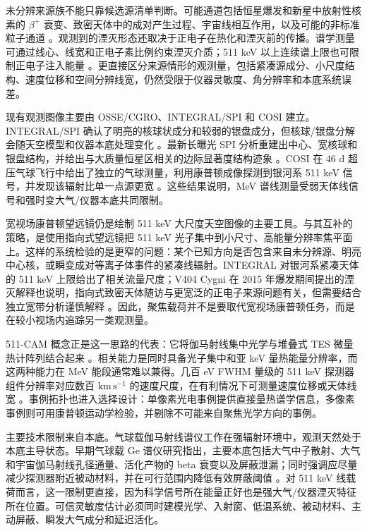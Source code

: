 \documentclass[preprint,12pt]{elsarticle}
\begin{document}
未分辨来源族不能只靠候选源清单判断。可能通道包括恒星爆发和新星中放射性核素的 $\beta^+$ 衰变、致密天体中的成对产生过程、宇宙线相互作用，以及可能的非标准粒子通道 \cite{Prantzos2011,Siegert2016AA,Yoneda2025}。观测到的湮灭形态还取决于正电子在热化和湮灭前的传播。谱学测量可通过线心、线宽和正电子素比例约束湮灭介质；511 keV 以上连续谱上限也可限制正电子注入能量 \cite{Prantzos2011,Jean2006,Siegert2019Kinematics}。更直接区分来源情形的观测量，包括紧凑源成分、小尺度结构、速度位移和空间分辨线宽，仍然受限于仪器灵敏度、角分辨率和本底系统误差。

现有观测图像主要由 OSSE/CGRO、INTEGRAL/SPI 和 COSI 建立。INTEGRAL/SPI 确认了明亮的核球状成分和较弱的银盘成分，但核球/银盘分解会随天空模型和仪器本底处理变化 \cite{Siegert2016AA,Yoneda2025}。最新长曝光 SPI 分析重建出中心、宽核球和银盘结构，并给出与大质量恒星区相关的边际显著度结构迹象 \cite{Yoneda2025}。COSI 在 46 d 超压气球飞行中给出了独立的气球测量，利用康普顿成像探测到银河系 511 keV 信号，并发现该辐射比单一点源更宽 \cite{Kierans2020,Siegert2020COSI}。这些结果说明，MeV 谱线测量受弱天体线信号和强时变大气/仪器本底共同限制。

宽视场康普顿望远镜仍是绘制 511 keV 大尺度天空图像的主要工具。与其互补的策略，是使用指向式望远镜把 511 keV 光子集中到小尺寸、高能量分辨率焦平面上。这样的系统检验的是更窄的问题：某个已知方向是否包含来自未分辨源、明亮中心核，或瞬变成对等离子体事件的紧凑线辐射。INTEGRAL 对银河系紧凑天体的 511 keV 上限给出了相关流量尺度；V404 Cygni 在 2015 年爆发期间提出的湮灭解释也说明，指向式致密天体随访与更宽泛的正电子来源问题有关，但需要结合独立宽带分析谨慎解释 \cite{DeCesare2011,Siegert2016V404,Roques2015}。因此，聚焦载荷并不是要取代宽视场康普顿任务，而是在较小视场内追踪另一类观测量。

511-CAM 概念正是这一思路的代表：它将伽马射线集中光学与堆叠式 TES 微量热计阵列结合起来 \cite{Shirazi2023}。相关能力是同时具备光子集中和亚 keV 量热能量分辨率，而这两种能力在 MeV 能段通常难以兼得。几百 eV FWHM 量级的 511 keV 探测器组件分辨率对应数百 $\mathrm{km\,s^{-1}}$ 的速度尺度，在有利情况下可测量速度位移或天体线宽 \cite{Shirazi2023}。事例拓扑也进入选择设计：单像素光电事例提供直接量热谱学信息，多像素事例则可用康普顿运动学检验，并剔除不可能来自聚焦光学方向的事例。

主要技术限制来自本底。气球载伽马射线谱仪工作在强辐射环境中，观测天然处于本底主导状态。早期气球载 Ge 谱仪研究指出，主要本底包括大气中子散射、大气和宇宙伽马射线孔径通量、活化产物的 beta 衰变以及屏蔽泄漏；同时强调应尽量减少探测器附近被动材料，并在可行范围内降低有效屏蔽阈值 \cite{Gehrels1985}。对 511 keV 线载荷而言，这一限制更直接，因为科学信号所在能量正好也是强大气/仪器湮灭特征所在位置。可信灵敏度估计必须同时建模光学、入射窗、低温系统、被动材料、主动屏蔽、瞬发大气成分和延迟活化。
\end{document}
